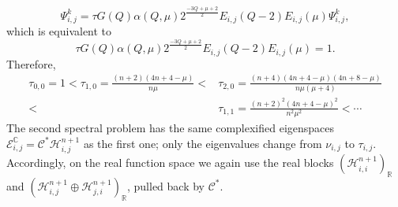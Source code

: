 \documentclass[10pt,a4paper]{amsart}
\begin{document}
\begin{equation*}
 \Psi_{i,j}^k=\tau G(Q)\alpha(Q,\mu)2^{\frac{-3Q+\mu+2}{2}}E_{i,j}(Q-2)E_{i,j}(\mu) \Psi_{i,j}^k,
\end{equation*}
which is equivalent to
\begin{equation*}
 \tau G(Q)\alpha(Q,\mu)2^{\frac{-3Q+\mu+2}{2}}E_{i,j}(Q-2)E_{i,j}(\mu)=1.
\end{equation*}
Therefore,
\begin{align}\label{eig2}
 \tau_{0,0}=1<\tau_{1,0}=\frac{(n+2)(4n+4-\mu)}{n\mu}<&\tau_{2,0}=\frac{(n+4)(4n+4-\mu)(4n+8-\mu)}{n\mu(\mu+4)}
\nonumber \\ <&\tau_{1,1}=\frac{(n+2)^2(4n+4-\mu)^2}{n^2\mu^2}<\cdots
\end{align}
{The second spectral problem has the same complexified eigenspaces $\mathcal E_{i,j}^{\mathbb C}=\mathcal C^*\mathcal H_{i,j}^{n+1}$ as the first one; only the eigenvalues change from $\nu_{i,j}$ to $\tau_{i,j}$. Accordingly, on the real function space we again use the real blocks $(\mathcal H_{i,i}^{n+1})_{\mathbb R}$ and $(\mathcal H_{i,j}^{n+1}\oplus\mathcal H_{j,i}^{n+1})_{\mathbb R}$, pulled back by $\mathcal C^*$.}
\end{document}
